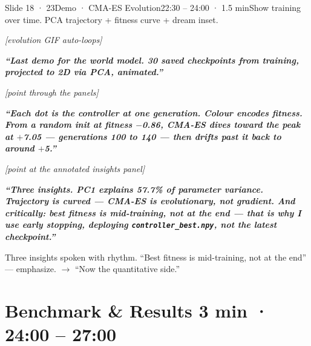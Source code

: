 \documentclass[11pt,a4paper]{article}
\newcommand{\say}[1]{%
    \par\vspace{0.3em}%
    \begingroup
    \leftskip=12pt
    \rightskip=8pt
    \color{thStrong}%
    \itshape\textbf{“#1”}%
    \par
    \endgroup
    \vspace{0.2em}
}
\newcommand{\stage}[1]{%
    \par\textcolor{thMuted}{\small\textit{[#1]}}\par
    \vspace{0.2em}
}
\newcommand{\emphw}[1]{\textbf{\textcolor{thAmber}{#1}}}
\begin{document}
\begin{slide}{Slide 18 · 23}{Demo · CMA-ES Evolution}{22:30 – 24:00 · 1.5 min}{Show training over time. PCA trajectory + fitness curve + dream inset.}
\stage{evolution GIF auto-loops}

\say{Last demo for the world model. \textbf{30 saved checkpoints} from training, projected to 2D via PCA, animated.}

\stage{point through the panels}

\say{Each dot is the controller at one generation. Colour encodes fitness. From a random init at fitness \textbf{$-$0.86}, CMA-ES dives toward the peak at \textbf{$+$7.05} — generations \textbf{100 to 140} — then drifts past it back to around \textbf{$+$5}.}

\stage{point at the annotated insights panel}

\say{Three insights. \emphw{PC1 explains 57.7\% of parameter variance.} Trajectory is \emphw{curved} — CMA-ES is evolutionary, not gradient. And critically: \emphw{best fitness is mid-training, not at the end} — that is why I use \textbf{early stopping}, deploying \texttt{controller\_best.npy}, not the latest checkpoint.}

\begin{stagebox}
Three insights spoken with rhythm. ``Best fitness is mid-training, not at the end'' — emphasize. $\rightarrow$ ``Now the quantitative side.''
\end{stagebox}
\end{slide}

\section{Benchmark \& Results \hfill \textcolor{thMuted}{\small 3 min · 24:00 – 27:00}}
\end{document}

